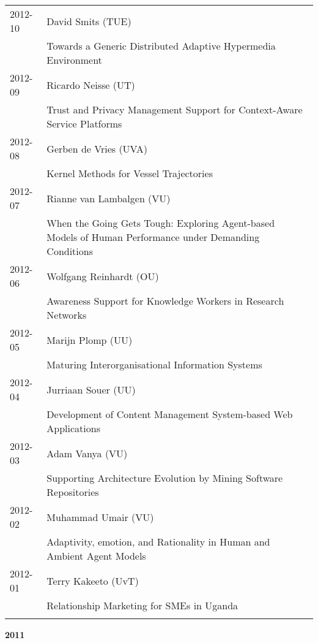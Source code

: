 \begin{longtable}{p{1.25cm}p{10.75cm}}
2012-10 & David Smits (TUE) \\& Towards a Generic Distributed Adaptive Hypermedia Environment \\
2012-09 & Ricardo Neisse (UT) \\& Trust and Privacy Management Support for Context-Aware Service Platforms \\
2012-08 & Gerben de Vries (UVA) \\& Kernel Methods for Vessel Trajectories \\
2012-07 & Rianne van Lambalgen (VU) \\& When the Going Gets Tough: Exploring Agent-based Models of Human Performance under Demanding Conditions \\
2012-06 & Wolfgang Reinhardt (OU) \\& Awareness Support for Knowledge Workers in Research Networks \\
2012-05 & Marijn Plomp (UU) \\& Maturing Interorganisational Information Systems \\
2012-04 & Jurriaan Souer (UU) \\& Development of Content Management System-based Web Applications \\
2012-03 & Adam Vanya (VU) \\& Supporting Architecture Evolution by Mining Software Repositories \\
2012-02 & Muhammad Umair (VU) \\& Adaptivity, emotion, and Rationality in Human and Ambient Agent Models \\
2012-01 & Terry Kakeeto (UvT) \\& Relationship Marketing for SMEs in Uganda \\
\\
\end{longtable}

\begin{center}
	\large{\textbf{2011}}
\end{center}

